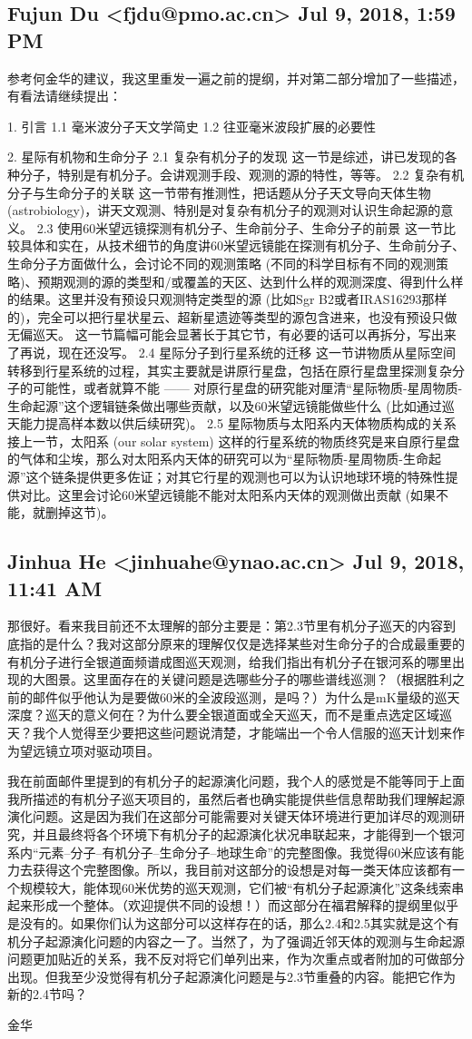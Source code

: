 \documentclass{article}
\newcommand\from[2]{\subsection{{#1} {#2}}}
\newcommand\said[1]{#1}
\begin{document}
\from{
Fujun Du <fjdu@pmo.ac.cn>
}{
Jul 9, 2018, 1:59 PM
}
\said{
参考何金华的建议，我这里重发一遍之前的提纲，并对第二部分增加了一些描述，有看法请继续提出：

1. 引言
1.1 毫米波分子天文学简史
1.2 往亚毫米波段扩展的必要性

2. 星际有机物和生命分子
2.1 复杂有机分子的发现
这一节是综述，讲已发现的各种分子，特别是有机分子。会讲观测手段、观测的源的特性，等等。
2.2 复杂有机分子与生命分子的关联
这一节带有推测性，把话题从分子天文导向天体生物 (astrobiology)，讲天文观测、特别是对复杂有机分子的观测对认识生命起源的意义。
2.3 使用60米望远镜探测有机分子、生命前分子、生命分子的前景
这一节比较具体和实在，从技术细节的角度讲60米望远镜能在探测有机分子、生命前分子、生命分子方面做什么，会讨论不同的观测策略 (不同的科学目标有不同的观测策略)、预期观测的源的类型和/或覆盖的天区、达到什么样的观测深度、得到什么样的结果。这里并没有预设只观测特定类型的源 (比如Sgr B2或者IRAS16293那样的)，完全可以把行星状星云、超新星遗迹等类型的源包含进来，也没有预设只做无偏巡天。
这一节篇幅可能会显著长于其它节，有必要的话可以再拆分，写出来了再说，现在还没写。
2.4 星际分子到行星系统的迁移
这一节讲物质从星际空间转移到行星系统的过程，其实主要就是讲原行星盘，包括在原行星盘里探测复杂分子的可能性，或者就算不能 —— 对原行星盘的研究能对厘清“星际物质-星周物质-生命起源”这个逻辑链条做出哪些贡献，以及60米望远镜能做些什么 (比如通过巡天能力提高样本数以供后续研究)。
2.5 星际物质与太阳系内天体物质构成的关系
接上一节，太阳系 (our solar system) 这样的行星系统的物质终究是来自原行星盘的气体和尘埃，那么对太阳系内天体的研究可以为“星际物质-星周物质-生命起源”这个链条提供更多佐证；对其它行星的观测也可以为认识地球环境的特殊性提供对比。这里会讨论60米望远镜能不能对太阳系内天体的观测做出贡献 (如果不能，就删掉这节)。
}

\from{
Jinhua He <jinhuahe@ynao.ac.cn>
}{
Jul 9, 2018, 11:41 AM
}
\said{
那很好。看来我目前还不太理解的部分主要是：第2.3节里有机分子巡天的内容到底指的是什么？我对这部分原来的理解仅仅是选择某些对生命分子的合成最重要的有机分子进行全银道面频谱成图巡天观测，给我们指出有机分子在银河系的哪里出现的大图景。这里面存在的关键问题是选哪些分子的哪些谱线巡测？（根据胜利之前的邮件似乎他认为是要做60米的全波段巡测，是吗？）为什么是mK量级的巡天深度？巡天的意义何在？为什么要全银道面或全天巡天，而不是重点选定区域巡天？我个人觉得至少要把这些问题说清楚，才能端出一个令人信服的巡天计划来作为望远镜立项对驱动项目。

我在前面邮件里提到的有机分子的起源演化问题，我个人的感觉是不能等同于上面我所描述的有机分子巡天项目的，虽然后者也确实能提供些信息帮助我们理解起源演化问题。这是因为我们在这部分可能需要对关键天体环境进行更加详尽的观测研究，并且最终将各个环境下有机分子的起源演化状况串联起来，才能得到一个银河系内“元素--分子--有机分子--生命分子--地球生命”的完整图像。我觉得60米应该有能力去获得这个完整图像。所以，我目前对这部分的设想是对每一类天体应该都有一个规模较大，能体现60米优势的巡天观测，它们被“有机分子起源演化”这条线索串起来形成一个整体。（欢迎提供不同的设想！）而这部分在福君解释的提纲里似乎是没有的。如果你们认为这部分可以这样存在的话，那么2.4和2.5其实就是这个有机分子起源演化问题的内容之一了。当然了，为了强调近邻天体的观测与生命起源问题更加贴近的关系，我不反对将它们单列出来，作为次重点或者附加的可做部分出现。但我至少没觉得有机分子起源演化问题是与2.3节重叠的内容。能把它作为新的2.4节吗？

金华
}
\end{document}
